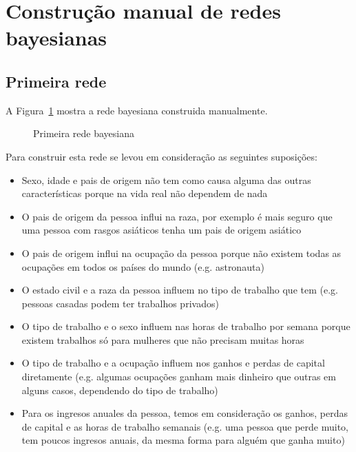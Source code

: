 \section{Construção manual de redes bayesianas}
\label{sec:construcao}

\subsection{Primeira rede}
	A Figura~\ref{fig:rede1} mostra a rede bayesiana construida manualmente.
	\begin{figure}[H]
		\centering
		
		\caption{Primeira rede bayesiana}
		\label{fig:rede1}
	\end{figure}
	Para construir esta rede se levou em consideração as seguintes suposições:
	\begin{itemize}
		\item Sexo, idade e pais de origem não tem como causa alguma das outras características porque na vida real não dependem de nada
		\item O pais de origem da pessoa influi na raza, por exemplo é mais seguro que uma pessoa com rasgos asiáticos tenha um pais de origem asiático
		\item O pais de origem influi na ocupação da pessoa porque não existem todas as ocupações em todos os países do mundo (e.g. astronauta)
		\item O estado civil e a raza da pessoa influem no tipo de trabalho que tem (e.g. pessoas casadas podem ter trabalhos privados)
		\item O tipo de trabalho e o sexo influem nas horas de trabalho por semana porque existem trabalhos só para mulheres que não precisam muitas horas
		\item O tipo de trabalho e a ocupação influem nos ganhos e perdas de capital diretamente (e.g. algumas ocupações ganham mais dinheiro que outras em alguns casos, dependendo do tipo de trabalho)
		\item Para os ingresos anuales da pessoa, temos em consideração os ganhos, perdas de capital e as horas de trabalho semanais (e.g. uma pessoa que perde muito, tem poucos ingresos anuais, da mesma forma para alguém que ganha muito)
	\end{itemize}
	
